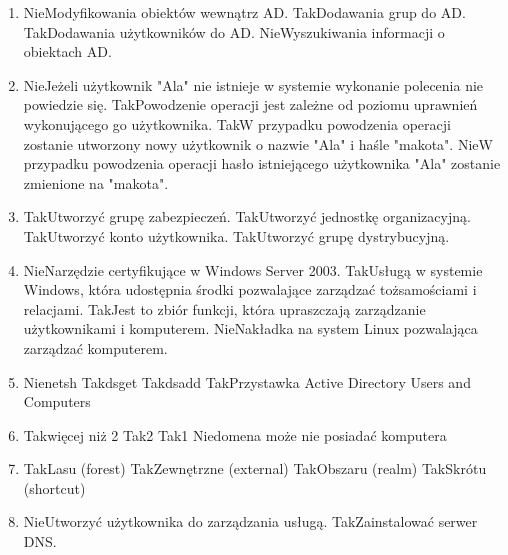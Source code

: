 \begin{enumerate}
		{Nie}{Domeny zorganizowane w drzewo reprezentowane są w rożnych przestrzeniach adresowych DNS.}%
		{Nie}{Domena może istnieć samodzielnie, nie musi istnieć w jakimś drzewie i jakimś lesie}
		\item {}%
		{Nie}{Modyfikowania obiektów wewnątrz AD.}%
		{Tak}{Dodawania grup do AD.}%
		{Tak}{Dodawania użytkowników do AD.}%
		{Nie}{Wyszukiwania informacji o obiektach AD.}
		\item {}%
		{Nie}{Jeżeli użytkownik "Ala" nie istnieje w systemie wykonanie polecenia nie powiedzie się.}%
		{Tak}{Powodzenie operacji jest zależne od poziomu uprawnień wykonującego go użytkownika.}%
		{Tak}{W przypadku powodzenia operacji zostanie utworzony nowy użytkownik o nazwie "Ala" i haśle "makota".}%
		{Nie}{W przypadku powodzenia operacji hasło istniejącego użytkownika "Ala" zostanie zmienione na "makota".}
		\item {}%
		{Tak}{Utworzyć grupę zabezpieczeń.}%
		{Tak}{Utworzyć jednostkę organizacyjną.}%
		{Tak}{Utworzyć konto użytkownika.}%
		{Tak}{Utworzyć grupę dystrybucyjną.}
		\item {}%
		{Nie}{Narzędzie certyfikujące w Windows Server 2003.}%
		{Tak}{Usługą w systemie Windows, która udostępnia środki pozwalające zarządzać tożsamościami i relacjami.}%
		{Tak}{Jest to zbiór funkcji, która upraszczają zarządzanie użytkownikami i komputerem.}%
		{Nie}{Nakładka na system Linux pozwalająca zarządzać komputerem.}
		\item {}%
		{Nie}{netsh}%
		{Tak}{dsget}%
		{Tak}{dsadd}%
		{Tak}{Przystawka Active Directory Users and Computers}
		\item {}%
		{Tak}{więcej niż 2}%
		{Tak}{2}%
		{Tak}{1}%
		{Nie}{domena może nie posiadać komputera}
		\item {}%
		{Tak}{Lasu (forest)}%
		{Tak}{Zewnętrzne (external)}%
		{Tak}{Obszaru (realm)}%
		{Tak}{Skrótu (shortcut)}
		\item {}%
		{Nie}{Utworzyć użytkownika do zarządzania usługą.}%
		{Tak}{Zainstalować serwer DNS.}%

\end{enumerate}
